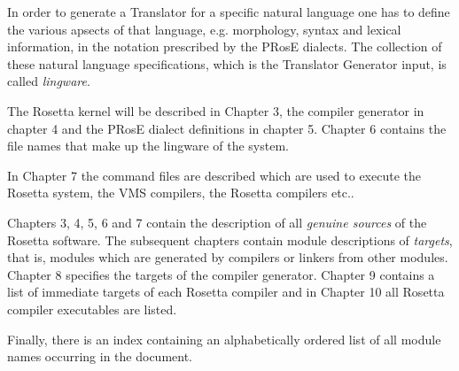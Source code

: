 In order to generate a Translator for a specific natural language one has to
 define the various apsects of that
language, e.g. morphology, syntax and lexical information,
in the notation prescribed by the {\sf PRosE} dialects. The collection of
these  natural
language specifications, which is
the Translator Generator input, is called {\em lingware}.

The Rosetta kernel will be described in Chapter 3, the compiler generator in
chapter 4 and the {\sf PRosE} dialect definitions in chapter 5. Chapter 6
contains the file names that make up the lingware of the system.

In Chapter 7 the command files are described which are used to execute the
Rosetta system, the VMS compilers, the Rosetta compilers etc..

Chapters 3, 4, 5, 6 and 7 contain the description of all {\em genuine sources}
of the Rosetta software. The subsequent chapters contain module descriptions
of {\em targets}, that is, modules which are generated by compilers or linkers
from other modules. Chapter 8 specifies the targets of the compiler generator.
Chapter 9 contains a list of immediate targets of each
Rosetta compiler and in Chapter 10 all Rosetta compiler executables are listed.

Finally, there is an index containing an alphabetically ordered list of all
module names occurring in the document.

